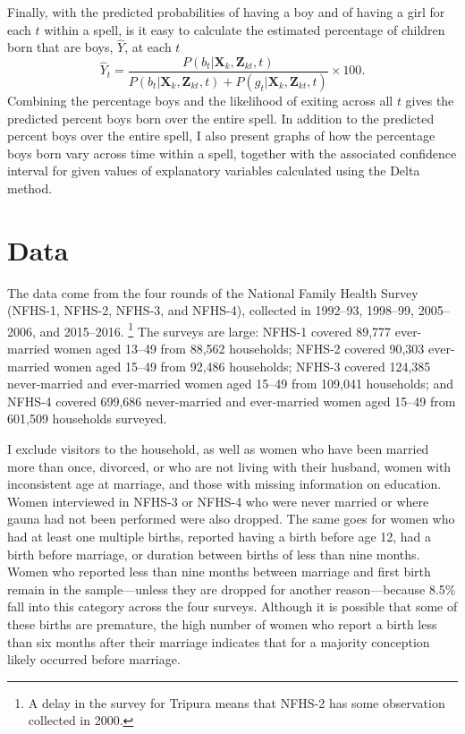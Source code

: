 \documentclass[12pt,letterpaper]{article}
\begin{document}
Finally, with the predicted probabilities of having a boy and of having 
a girl for each $t$ within a spell, is it easy to calculate the estimated 
percentage of children born that are boys, $\hat{Y}$, at each $t$  
\begin{equation}
\hat{Y}_t 
= 
\frac{ P(b_{t} | \mathbf{X}_{k}, \mathbf{Z}_{kt},t )}
{ P(b_{t} | \mathbf{X}_{k}, \mathbf{Z}_{kt},t) + P(g_{t} | \mathbf{X}_{k}, \mathbf{Z}_{kt},t )} 
\times 100.
\label{eq:probability_son}
\end{equation}
Combining the percentage boys and the likelihood of exiting across all $t$ 
gives the predicted percent boys born over the entire spell.
In addition to the predicted percent boys over the entire spell, 
I also present graphs of how the percentage boys born vary across time
within a spell, together with the associated confidence interval for given 
values of explanatory variables calculated using the Delta method.


\section{Data\label{sec:data}}

The data come from the four rounds of the National Family Health Survey 
(NFHS-1, NFHS-2, NFHS-3, and NFHS-4),
collected in 1992--93, 1998--99, 2005--2006, and 2015--2016.%
\footnote{
A delay in the survey for Tripura means that NFHS-2 has some observation 
collected in 2000.
}
The surveys are large: NFHS-1 covered 89,777 ever-married women 
aged 13--49 from 88,562 households;
NFHS-2 covered 90,303 ever-married women aged 15--49 from 92,486 households;
NFHS-3 covered 124,385 never-married and ever-married women aged 
15--49 from 109,041 households;
and 
NFHS-4 covered 699,686 never-married and ever-married women aged
15--49 from 601,509 households surveyed.

I exclude visitors to the household, as well as
women who have been married more than once, divorced, or who are 
not living with their husband,
women with inconsistent age at marriage,
and those with missing information on education.
Women interviewed in NFHS-3 or NFHS-4 who were never married or where gauna 
had not been performed were also dropped.
The same goes for women who had at least one multiple births,
reported having a birth before age 12, had a birth before marriage, or
duration between births of less than nine months.
Women who reported less than nine months between marriage and first birth
remain in the sample---unless they are dropped for another reason---because 
8.5\% fall into this category across the four surveys.
Although it is possible that some of these births are premature, the high number of
women who report a birth less than six months after their marriage indicates that for
a majority conception likely occurred before marriage.
\end{document}
